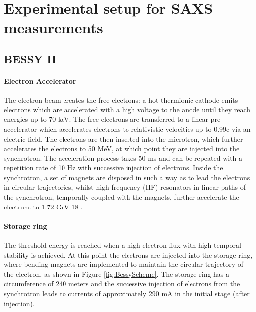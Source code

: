 \chapter{Experimental setup for SAXS measurements}
\label{chap:experimental_setup}

\section{BESSY II}

\subsubsection{Electron Accelerator}

The electron beam creates the free electrons: a hot thermionic cathode emits electrons which are accelerated with a high voltage to the anode until they reach energies up to 70 keV. The free electrons are transferred to a linear pre-accelerator which accelerates electrons to relativistic velocities up to 0.99c via an electric field. The electrons are then inserted into the microtron, which further accelerates the electrons to 50 MeV, at which point they are injected into the synchrotron. The acceleration process takes 50 ms and can be repeated with a repetition rate of 10 Hz with successive injection of electrons. Inside the synchrotron, a set of magnets are disposed in such a way as to lead the electrons in circular trajectories, whilst high frequency (HF) resonators in linear paths of the synchrotron, temporally coupled with the magnets, further accelerate the electrons to 1.72 GeV 18 .

\subsubsection{Storage ring}

The threshold energy is reached when a high electron flux with high temporal stability is achieved. At this point the electrons are injected into the storage ring, where bending magnets are implemented to maintain the circular trajectory of the electron, as shown in Figure \ref{fig:BessyScheme}. The storage ring has a circumference of 240 meters and the successive injection of electrons from the synchrotron leads to currents of approximately 290 mA in the initial stage (after injection).

